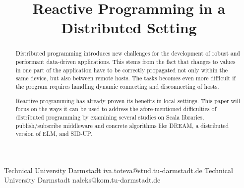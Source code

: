 \documentclass{sigplanconf}
\begin{document}
\setlength{\pdfpageheight}{\paperheight}
\setlength{\pdfpagewidth}{\paperwidth}

\copyrightdata%
\doi%




\titlebanner{}        %
\preprintfooter{}   %

\title{Reactive Programming in a Distributed Setting}
\subtitle{}

           {Technical University Darmstadt}
           {iva.toteva@stud.tu-darmstadt.de}
           {Technical University Darmstadt}
           {naleks@kom.tu-darmstadt.de}

\maketitle

\begin{abstract}
Distributed programming introduces new challenges for the development of robust and performant data-driven applications. This stems from the fact that changes to values in one part of the application have to be correctly propagated not only within the same device, but also between remote hosts. The tasks becomes even more difficult if the program requires handling dynamic connecting and disconnecting of hosts.

Reactive programming has already proven its benefits in local settings\cite{bridging}. This paper will focus on the ways it can be used to address the afore-mentioned difficulties of distributed programming by examining several studies on Scala libraries, publish/subscribe middleware and concrete algorithms like DREAM, a distributed version of ELM, and SID-UP.

\end{abstract}
\end{document}
